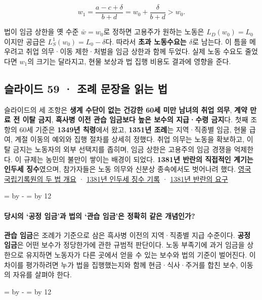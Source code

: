 \documentclass[10pt,a4paper]{article}
\newcommand{\ReserveQuestionSpace}{%
  \par\begingroup
  \dimen0=\pagegoal \advance\dimen0 by -\pagetotal
  \dimen2=\baselineskip \multiply\dimen2 by 12
  \ifdim\dimen0<\dimen2 \newpage\fi
  \endgroup}
\begin{document}
\[
w_1=\frac{a-c+\delta}{b+d}
=w_0+\frac{\delta}{b+d}>w_0.
\]

법이 임금 상한을 옛 수준 $\bar w=w_0$로 정하면 고용주가 원하는 노동은 $L_D(w_0)=L_0$이지만 공급은 $L_S^1(w_0)=L_0-\delta$다. 따라서 \textbf{초과 노동수요는 $\delta$}로 남는다. 이 틈을 메우려고 취업 의무·이동 제한·처벌을 임금 상한과 함께 두었다. 실제 노동 수요도 줄었다면 $w_1$의 크기는 달라지고, 현물 보상과 법 집행 비용도 결과에 영향을 준다.\par

\subsection{슬라이드 59 · 조례 문장을 읽는 법}
슬라이드의 세 조항은 \textbf{생계 수단이 없는 건강한 60세 미만 남녀의 취업 의무}, \textbf{계약 만료 전 이탈 금지}, \textbf{흑사병 이전 관습 임금보다 높은 보수의 지급·수령 금지}다. 첫째 조항의 60세 기준은 \textbf{1349년 칙령}에서 왔고, \textbf{1351년 조례}는 지역·직종별 임금, 현물 급여, 계절 이동의 예외와 집행 절차를 상세히 정했다. 취업 의무는 노동을 확보하고, 이탈 금지는 노동자의 외부 선택지를 좁히며, 임금 상한은 고용주의 임금 경쟁을 억제한다. 이 규제는 농민의 불만이 쌓이는 배경이 되었다. \textbf{1381년 반란의 직접적인 계기는 인두세 징수}였으며, 참가자들은 노동 의무와 신분상 종속에서도 벗어나려 했다. \href{https://www.nationalarchives.gov.uk/explore-the-collection/explore-by-time-period/early-modern/plague/}{영국 국립기록원의 두 법 개요} · \href{https://www.nationalarchives.gov.uk/e179/notes.asp?action=3\&slctgrantid=407}{1381년 인두세 징수 기록} · \href{https://archive.history.ac.uk/ihr-london-rebels/daily-schedule}{1381년 반란의 요구}\par

\ReserveQuestionSpace
\paragraph{당시의 ‘공정 임금’과 법의 ‘관습 임금’은 정확히 같은 개념인가?}
\textbf{관습 임금}은 조례가 기준으로 삼은 흑사병 이전의 지역·직종별 지급 수준이다. \textbf{공정 임금}은 어떤 보수가 정당한가에 관한 규범적 판단이다. 노동 부족기에 과거 임금을 상한으로 유지하면 노동자가 다른 곳에서 얻을 수 있는 보수와 법의 기준이 벌어진다. 이 차이를 평가하려면 누가 법을 집행했는지와 함께 현금·식사·주거를 합친 보수, 이동의 자유를 살펴야 한다.\par

\ReserveQuestionSpace
\end{document}
